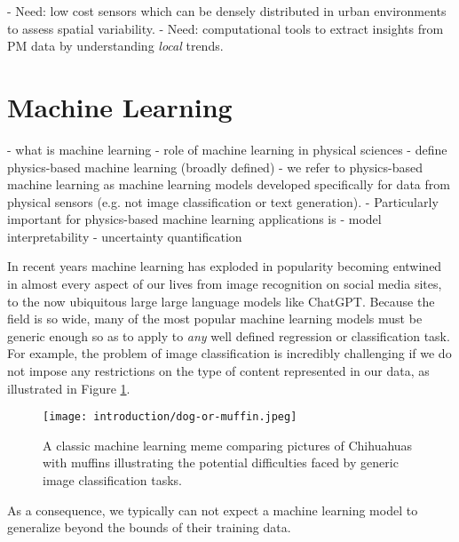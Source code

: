 - Need: low cost sensors which can be densely distributed in urban environments
to assess spatial variability.
- Need: computational tools to extract insights from PM data by understanding
\textit{local} trends.






\section{Machine Learning}

- what is machine learning
- role of machine learning in physical sciences
- define physics-based machine learning (broadly defined)
   - we refer to physics-based machine learning as machine learning models
   developed specifically for data from physical sensors (e.g. not image
   classification or text generation).
   - Particularly important for physics-based machine learning applications is
   - model interpretability
   - uncertainty quantification

In recent years machine learning has exploded in popularity becoming entwined in
almost every aspect of our lives from image recognition on social media sites,
to the now ubiquitous large large language models like ChatGPT. Because the
field is so wide, many of the most popular machine learning models must be
generic enough so as to apply to \textit{any} well defined regression or
classification task. For example, the problem of image classification is
incredibly challenging if we do not impose any restrictions on the type of
content represented in our data, as illustrated in Figure
\ref{fig:dog-or-muffin}.

\begin{figure}[!hbt]
  \centering
  \texttt{[image: introduction/dog-or-muffin.jpeg]}
  \caption{A classic machine learning meme comparing pictures of Chihuahuas with muffins illustrating the potential difficulties faced by generic image classification tasks.}
  \label{fig:dog-or-muffin}
\end{figure}
As a consequence, we typically can not expect a machine learning model to
generalize beyond the bounds of their training data.



